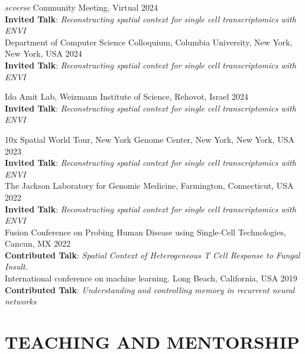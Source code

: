 \documentclass[a4paper,9pt]{extarticle}
\begin{document}
\noindent
\textit{scverse} Community Meeting, Virtual \hfill  2024 \\
\textbf{Invited Talk}: \textit{Reconstructing spatial context for single cell transcriptomics with ENVI}	\\

\noindent
Department of Computer Science Colloquium, Columbia University, New York, New York, USA \hfill  2024 \\
\textbf{Invited Talk}: \textit{Reconstructing spatial context for single cell transcriptomics with ENVI}	\\

\begin{samepage}
\noindent
Ido Amit Lab, Weizmann Institute of Science, Rehovot, Israel \hfill  2024 \\
\textbf{Invited Talk}: \textit{Reconstructing spatial context for single cell transcriptomics with ENVI}	\\
\par
\end{samepage}

\noindent
10x Spatial World Tour, New York Genome Center, New York, New York, USA \hfill  2023 \\
\textbf{Invited Talk}: \textit{Reconstructing spatial context for single cell transcriptomics with ENVI}	\\

\noindent
 The Jackson Laboratory for Genomic Medicine, Farmington, Connecticut, USA \hfill 2022\\
\textbf{Invited Talk}: \textit{Reconstructing spatial context for single cell transcriptomics with ENVI}	\\

\noindent
Fusion Conference on Probing Human Disease using Single-Cell Technologies, Cancun, MX \hfill  2022 \\
\textbf{Contributed Talk}: \textit{Spatial Context of Heterogeneous T Cell Response to Fungal Insult.}	\\

\noindent
International conference on machine learning. Long Beach, California, USA \hfill  2019 \\
\textbf{Contributed Talk}: \textit{Understanding and controlling memory in recurrent neural networks}	\\




\section*{TEACHING AND MENTORSHIP}
\end{document}
